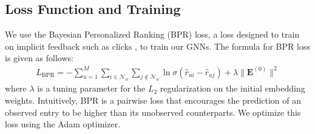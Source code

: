 \documentclass{article}
\begin{document}
\subsection{Loss Function and Training} \label{bpr_loss}

We use the Bayesian Personalized Ranking (BPR) loss, a loss designed to train on implicit feedback such as clicks \cite{bprloss}, to train our GNNs. The formula for BPR loss is given as follows:
\begin{align*}
    L_{\mbox{BPR}} = - \sum_{u = 1}^M \sum_{i \in \mathcal{N}_u} \sum_{j \notin \mathcal{N}_u} \ln \sigma(\hat{r}_{ui} - \hat{r}_{uj}) + \lambda \| \mathbf{E}^{(0)} \|^2
\end{align*}
where $\lambda$ is a tuning parameter for the $L_2$ regularization on the initial embedding weights. Intuitively, BPR is a pairwise loss that encourages the prediction of an observed entry to be higher than its unobserved counterparts. We optimize this loss using the Adam \cite{adam} optimizer.





\end{document}

